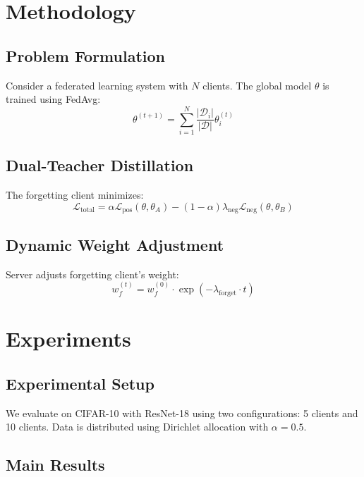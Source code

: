 \documentclass[10pt,twocolumn]{article}
\begin{document}
\section{Methodology}

\subsection{Problem Formulation}

Consider a federated learning system with $N$ clients. The global model $\theta$ is trained using FedAvg:
\begin{equation}
\theta^{(t+1)} = \sum_{i=1}^{N} \frac{|\mathcal{D}_i|}{|\mathcal{D}|} \theta_i^{(t)}
\end{equation}

\subsection{Dual-Teacher Distillation}

The forgetting client minimizes:
\begin{equation}
\mathcal{L}_{\text{total}} = \alpha \mathcal{L}_{\text{pos}}(\theta, \theta_A) - (1-\alpha) \lambda_{\text{neg}} \mathcal{L}_{\text{neg}}(\theta, \theta_B)
\end{equation}

\subsection{Dynamic Weight Adjustment}

Server adjusts forgetting client's weight:
\begin{equation}
w_f^{(t)} = w_f^{(0)} \cdot \exp(-\lambda_{\text{forget}} \cdot t)
\end{equation}

\section{Experiments}

\subsection{Experimental Setup}

We evaluate on CIFAR-10 with ResNet-18 using two configurations: 5 clients and 10 clients. Data is distributed using Dirichlet allocation with $\alpha=0.5$.

\subsection{Main Results}
\end{document}
